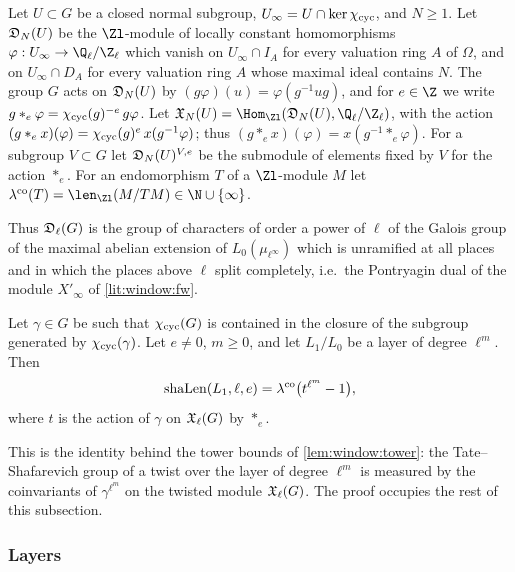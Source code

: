 \begin{definition}\label{pf:vwin-he:dinf}
Let $U\subset G$ be a closed normal subgroup, $U_\infty=U\cap\ker\chi_{\mathrm{cyc}}$, and $N\ge1$. Let $\mathfrak D_N(U)$ be the
$\Zl$-module of locally constant homomorphisms $\varphi:U_\infty\to\vwinheQZ$ which vanish on $U_\infty\cap I_A$ for
every valuation ring $A$ of $\Omega$, and on $U_\infty\cap D_A$ for every valuation ring $A$ whose maximal ideal
contains $N$. The group $G$ acts on $\mathfrak D_N(U)$ by $(g\varphi)(u)=\varphi(g^{-1}ug)$, and for $e\in\Z$ we write
$g\ast_e\varphi=\chi_{\mathrm{cyc}}(g)^{-e}\,g\varphi$. Let $\vwinheXX_N(U)=\Hom_{\Zl}(\vwinheD_N(U),\vwinheQZ)$, with the
action $(g\ast_ex)(\varphi)=\chi_{\mathrm{cyc}}(g)^e\,x(g^{-1}\varphi)$; thus $(g\ast_ex)(\varphi)=x(g^{-1}\ast_e\varphi)$. For a
subgroup $V\subset G$ let $\mathfrak D_N(U)^{V,e}$ be the submodule of elements fixed by $V$ for the action $\ast_e$. For
an endomorphism $T$ of a $\Zl$-module $M$ let $\vwinhecoker(T)=\len_{\Zl}(M/TM)\in\N\cup\{\infty\}$.
\end{definition}

Thus $\mathfrak D_\ell(G)$ is the group of characters of order a power of $\ell$ of the Galois group of the maximal
abelian extension of $L_0(\mu_{\ell^\infty})$ which is unramified at all places and in which the places above $\ell$
split completely, i.e.\ the Pontryagin dual of the module $X'_\infty$ of \cref{lit:window:fw}.

\begin{theorem}\label{pf:vwin-he:step0}
Let $\gamma\in G$ be such that $\chi_{\mathrm{cyc}}(G)$ is contained in the closure of the subgroup generated by
$\chi_{\mathrm{cyc}}(\gamma)$. Let $e\ne0$, $m\ge0$, and let $L_1/L_0$ be a layer of degree $\ell^m$. Then
\[
 \mathrm{shaLen}(L_1,\ell,e)=\lambda^{\mathrm{co}}\bigl(t^{\ell^m}-1\bigr),
\]
where $t$ is the action of $\gamma$ on $\mathfrak X_\ell(G)$ by $\ast_e$.
\end{theorem}

This is the identity behind the tower bounds of \cref{lem:window:tower}: the Tate--Shafarevich group of a twist
over the layer of degree $\ell^m$ is measured by the coinvariants of $\gamma^{\ell^m}$ on the twisted module
$\mathfrak X_\ell(G)$. The proof occupies the rest of this subsection.

\subsubsection{Layers}

